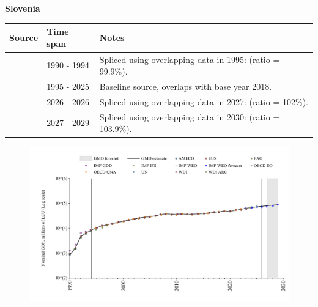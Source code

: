 \documentclass[12pt,a4paper,landscape]{article}
\begin{document}
\begin{adjustbox}{max totalsize={\paperwidth}{\paperheight},center}
\begin{minipage}[t][\textheight][t]{\textwidth}
\vspace*{0.5cm}
{}
\begin{center}
{\Large\bfseries Slovenia}
\end{center}
\vspace{0.5cm}
\begin{table}[H]
\centering
\small
\begin{tabular}{|l|l|l|}
\hline
\textbf{Source} & \textbf{Time span} & \textbf{Notes} \\
\hline
\rowcolor{white}\cite{AMECO}& 1990 - 1994 &Spliced using overlapping data in 1995: (ratio = 99.9\%).\\
\rowcolor{lightgray}\cite{OECD_EO}& 1995 - 2025 &Baseline source, overlaps with base year 2018.\\
\rowcolor{white}\cite{AMECO}& 2026 - 2026 &Spliced using overlapping data in 2027: (ratio = 102\%).\\
\rowcolor{lightgray}\cite{IMF_WEO_forecast}& 2027 - 2029 &Spliced using overlapping data in 2030: (ratio = 103.9\%).\\
\hline
\end{tabular}
\end{table}
\begin{figure}[H]
\centering
\includegraphics[width=\textwidth,height=0.6\textheight,keepaspectratio]{graphs/SVN_nGDP.pdf}
\end{figure}
\end{minipage}
\end{adjustbox}
\end{document}
